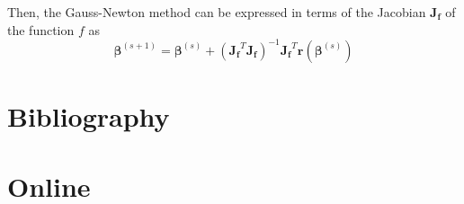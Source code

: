 \documentclass[10pt,conference,compsoc]{IEEEtran}
\newcommand{\mat}[1] {\mathbf{#1}}
\begin{document}
Then, the Gauss-Newton method can be expressed in terms of the Jacobian
$\mat{J_{f}}$ of the function $f$ as
\begin{equation*}
  \bm{\beta}^{(s+1)} = \bm{\beta}^{(s)} +
    (\mat{J_f}^T \mat{J_f})^{-1} \mat{J_f}^T \mat{r}\left(\bm{\beta}^{(s)}\right)
\end{equation*}

\section{Bibliography}

\section*{Online}
\printbibliography[heading=bibempty,type=online]
\end{document}
